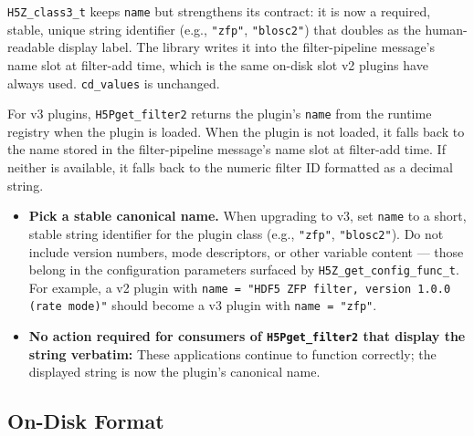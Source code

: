 \documentclass[../RFC-HDFG-2026-001.tex]{subfiles}
\begin{document}
\texttt{H5Z\_class3\_t} keeps \texttt{name} but strengthens its
contract: it is now a required, stable, unique string identifier
(e.g., \texttt{"zfp"}, \texttt{"blosc2"}) that doubles as the
human-readable display label.  The library writes it into the
filter-pipeline message's name slot at filter-add time, which is the
same on-disk slot v2 plugins have always used.  \texttt{cd\_values}
is unchanged.

For v3 plugins, \texttt{H5Pget\_filter2} returns the plugin's
\texttt{name} from the runtime registry when the plugin is loaded.
When the plugin is not loaded, it falls back to the name stored in
the filter-pipeline message's name slot at filter-add time.  If
neither is available, it falls back to the numeric filter ID
formatted as a decimal string.


\begin{itemize}
\item \textbf{Pick a stable canonical name.}  When upgrading to v3,
  set \texttt{name} to a short, stable string identifier for the
  plugin class (e.g., \texttt{"zfp"}, \texttt{"blosc2"}).  Do not
  include version numbers, mode descriptors, or other variable
  content --- those belong in the configuration parameters surfaced by
  \texttt{H5Z\_get\_config\_func\_t}.  For example, a v2 plugin with
  \texttt{name = "HDF5 ZFP filter, version 1.0.0 (rate mode)"} should
  become a v3 plugin with \texttt{name = "zfp"}.
\item \textbf{No action required for consumers of \texttt{H5Pget\_filter2}
  that display the string verbatim:} These applications continue to
  function correctly; the displayed string is now the plugin's
  canonical name.
\end{itemize}

\subsection{On-Disk Format}
\end{document}
